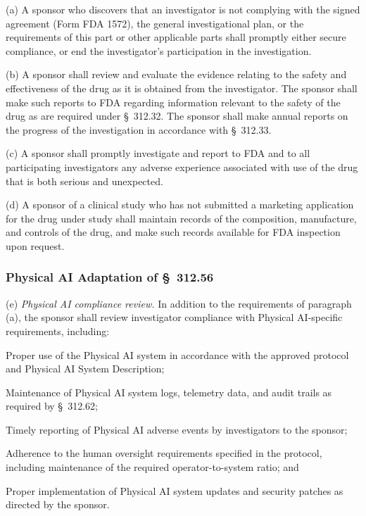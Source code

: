 (a) A sponsor who discovers that an investigator is not complying with the signed agreement (Form FDA 1572), the general investigational plan, or the requirements of this part or other applicable parts shall promptly either secure compliance, or end the investigator's participation in the investigation.

(b) A sponsor shall review and evaluate the evidence relating to the safety and effectiveness of the drug as it is obtained from the investigator. The sponsor shall make such reports to FDA regarding information relevant to the safety of the drug as are required under \S~312.32. The sponsor shall make annual reports on the progress of the investigation in accordance with \S~312.33.

(c) A sponsor shall promptly investigate and report to FDA and to all participating investigators any adverse experience associated with use of the drug that is both serious and unexpected.

(d) A sponsor of a clinical study who has not submitted a marketing application for the drug under study shall maintain records of the composition, manufacture, and controls of the drug, and make such records available for FDA inspection upon request.

\subsubsection{Physical AI Adaptation of \S~312.56}

(e) \textit{Physical AI compliance review.} In addition to the requirements of paragraph (a), the sponsor shall review investigator compliance with Physical AI-specific requirements, including:

\begin{description}[leftmargin=0.8cm,style=sameline]
\item[(i)] Proper use of the Physical AI system in accordance with the approved protocol and Physical AI System Description;
\item[(ii)] Maintenance of Physical AI system logs, telemetry data, and audit trails as required by \S~312.62;
\item[(iii)] Timely reporting of Physical AI adverse events by investigators to the sponsor;
\item[(iv)] Adherence to the human oversight requirements specified in the protocol, including maintenance of the required operator-to-system ratio; and
\item[(v)] Proper implementation of Physical AI system updates and security patches as directed by the sponsor.
\end{description}

